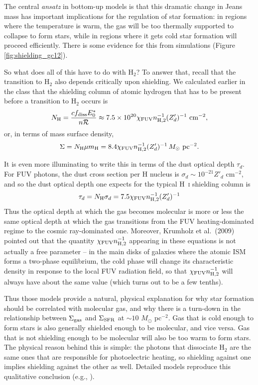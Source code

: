 The central \textit{ansatz} in bottom-up models is that this dramatic change in Jeans mass has important implications for the regulation of star formation: in regions where the temperature is warm, the gas will be too thermally supported to collapse to form stars, while in regions where it gets cold star formation will proceed efficiently. There is some evidence for this from simulations (Figure \ref{fig:shielding_gc12}).

So what does all of this have to do with H$_2$? To answer that, recall that the transition to H$_2$ also depends critically upon shielding. We calculated earlier in the class that the shielding column of atomic hydrogen that has to be present before a transition to H$_2$ occurs is
\begin{equation}
N_{\rm H} = \frac{c f_{\rm diss} E_0^*}{n \mathcal{R}} \approx 7.5\times 10^{20} \chi_{\rm FUV} n_{\rm H,2}^{-1} (Z'_d)^{-1}\mbox{ cm}^{-2},
\end{equation}
or, in terms of mass surface density,
\begin{equation}
\Sigma = N_{\rm H} \mu m_{\rm H} = 8.4 \chi_{\rm FUV} n_{\rm H,2}^{-1} (Z'_d)^{-1}\,M_\odot\mbox{ pc}^{-2}.
\end{equation}

It is even more illuminating to write this in terms of the dust optical depth $\tau_d$. For FUV photons, the dust cross section per H nucleus is $\sigma_d \sim 10^{-21} Z'_d$ cm$^{-2}$, and so the dust optical depth one expects for the typical H~\textsc{i} shielding column is
\begin{equation}
\tau_d = N_{\rm H} \sigma_d = 7.5 \chi_{\rm FUV} n_{\rm H,2}^{-1} (Z'_d)^{-1}
\end{equation}
Thus the optical depth at which the gas becomes molecular is more or less the same optical depth at which the gas transitions from the FUV heating-dominated regime to the cosmic ray-dominated one. Moreover, Krumholz et al.~(2009) pointed out that the quantity $\chi_{\rm FUV} n_{\rm H,2}^{-1}$ appearing in these equations is not actually a free parameter -- in the main disks of galaxies where the atomic ISM forms a two-phase equilibrium, the cold phase will change its characteristic density in response to the local FUV radiation field, so that $\chi_{\rm FUV} n_{\rm H,2}^{-1}$ will always have about the same value (which turns out to be a few tenths).

Thus those models provide a natural, physical explanation for why star formation should be correlated with molecular gas, and why there is a turn-down in the relationship between $\Sigma_{\rm gas}$ and $\Sigma_{\rm SFR}$ at $\sim 10$ $M_\odot$ pc$^{-2}$. Gas that is cold enough to form stars is also generally shielded enough to be molecular, and vice versa. Gas that is not shielding enough to be molecular will also be too warm to form stars. The physical reason behind this is simple: the photons that dissociate H$_2$ are the same ones that are responsible for photoelectric heating, so shielding against one implies shielding against the other as well. Detailed models reproduce this qualitative conclusion (e.g., \citealt{krumholz11b}).

